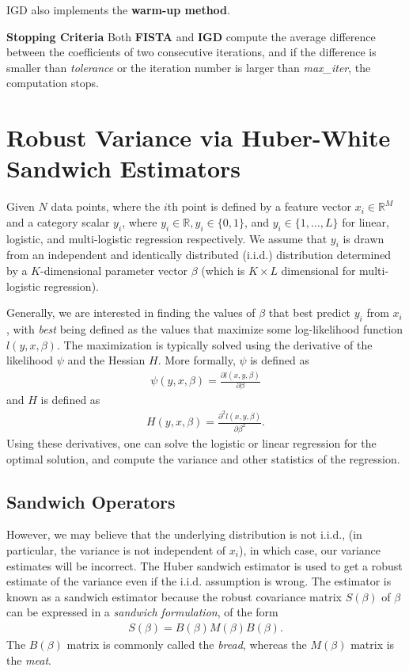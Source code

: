 IGD also implements the {\bf warm-up method}.

{\bf Stopping Criteria} Both {\bf FISTA} and {\bf IGD} compute the average difference
between the coefficients of two consecutive iterations, and if the
difference is smaller than \emph{tolerance} or the iteration number
is larger than \emph{max\_iter}, the computation stops.

\section{Robust Variance via Huber-White Sandwich Estimators}
Given  $N$ data points, where the $i$th point is defined by a feature  vector $x_i \in \mathbb{R}^M$ and a category scalar $y_i$, where $y_i \in \mathbb{R}, y_i \in \{0,1 \}$, and $y_i \in \{1,\dots, L \}$ for linear, logistic, and multi-logistic regression respectively.  We assume that $y_i$ is drawn from an independent and identically distributed (i.i.d.) distribution determined by a $K$-dimensional parameter vector $\beta$ (which is $K\times L$ dimensional for multi-logistic regression).  

Generally, we are interested in finding the values of $\beta$ that best predict $y_i$ from $x_i$, with \textit{best} being defined as the values that maximize some log-likelihood function $l(y,x,\beta)$.  The maximization is typically solved using the derivative of the likelihood $\psi$  and the Hessian $H$.  More formally, $\psi$ is defined as 
\begin{align}
\psi(y,x, \beta) = \frac{\partial l(x,y,\beta)}{\partial \beta}
\end{align} 
and $H$ is defined as
\begin{align}
H(y,x, \beta) = \frac{\partial^2 l(x,y,\beta)}{\partial \beta^2}.
\end{align} 
Using these derivatives, one can solve the logistic or linear regression for the optimal solution, and compute the variance and other statistics of the regression.  

\subsection{Sandwich Operators}
However, we may believe that the underlying distribution is not i.i.d., (in particular, the variance is not independent of $x_i$), in which case, our variance estimates will be incorrect. 
 The Huber sandwich estimator is used to get a robust estimate of the variance even if the i.i.d. assumption is wrong.  The estimator is known as a sandwich estimator because the robust covariance matrix $S(\beta)$ of $\beta$ can be expressed in a \textit{sandwich formulation}, of the form
\begin{align}
S(\beta) = B(\beta) M(\beta) B(\beta).  
\end{align}
The $B(\beta)$ matrix is commonly called the \textit{bread}, whereas the $M(\beta)$ matrix is the \textit{meat}.  

